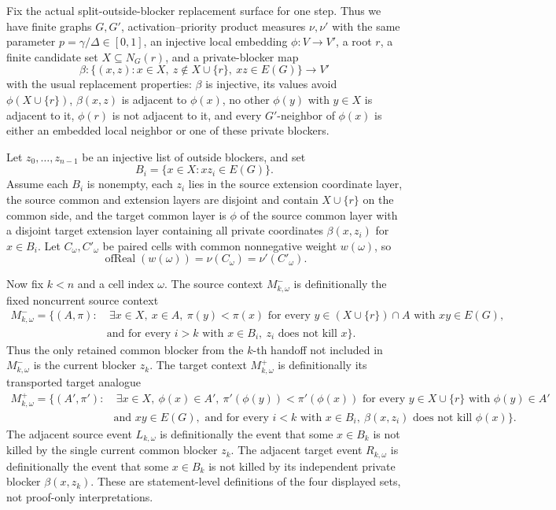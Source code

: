 \begin{helper}
Fix the actual split-outside-blocker replacement surface for one step.  Thus
we have finite graphs \(G,G'\), activation--priority product measures
\(\nu,\nu'\) with the same parameter \(p=\gamma/\Delta\in[0,1]\), an
injective local embedding \(\phi:V\to V'\), a root \(r\), a finite candidate
set \(X\subseteq N_G(r)\), and a private-blocker map
\[
\beta:\{(x,z):x\in X,\ z\notin X\cup\{r\},\ xz\in E(G)\}\to V'
\]
with the usual replacement properties: \(\beta\) is injective, its values
avoid \(\phi(X\cup\{r\})\), \(\beta(x,z)\) is adjacent to \(\phi(x)\), no
other \(\phi(y)\) with \(y\in X\) is adjacent to it, \(\phi(r)\) is not
adjacent to it, and every \(G'\)-neighbor of \(\phi(x)\) is either an
embedded local neighbor or one of these private blockers.

Let \(z_0,\ldots,z_{n-1}\) be an injective list of outside blockers, and set
\[
  B_i=\{x\in X:xz_i\in E(G)\}.
\]
Assume each \(B_i\) is nonempty, each \(z_i\) lies in the source extension
coordinate layer, the source common and extension layers are disjoint and
contain \(X\cup\{r\}\) on the common side, and the target common layer is
\(\phi\) of the source common layer with a disjoint target extension layer
containing all private coordinates \(\beta(x,z_i)\) for \(x\in B_i\).  Let
\(C_\omega,C'_\omega\) be paired cells with common nonnegative weight
\(w(\omega)\), so
\[
  \operatorname{ofReal}(w(\omega))=\nu(C_\omega)
  =\nu'(C'_\omega).
\]

Now fix \(k<n\) and a cell index \(\omega\).  The source context
\(M^-_{k,\omega}\) is definitionally the fixed noncurrent source context
\[
\begin{aligned}
M^-_{k,\omega}=\{(A,\pi):&\ \exists x\in X,\ x\in A,\ 
   \pi(y)<\pi(x)\text{ for every }y\in (X\cup\{r\})\cap A
   \text{ with }xy\in E(G),\\
&\text{and for every }i>k\text{ with }x\in B_i,\ 
   z_i\text{ does not kill }x\}.
\end{aligned}
\]
Thus the only retained common blocker from the \(k\)-th handoff not included
in \(M^-_{k,\omega}\) is the current blocker \(z_k\).  The target context
\(M^+_{k,\omega}\) is definitionally its transported target analogue
\[
\begin{aligned}
M^+_{k,\omega}=\{(A',\pi'):&\ \exists x\in X,\ \phi(x)\in A',\
   \pi'(\phi(y))<\pi'(\phi(x))\text{ for every }y\in X\cup\{r\}
   \text{ with }\phi(y)\in A'\\
&\text{and }xy\in E(G),\text{ and for every }i<k\text{ with }x\in B_i,\ 
   \beta(x,z_i)\text{ does not kill }\phi(x)\}.
\end{aligned}
\]
The adjacent source event \(L_{k,\omega}\) is definitionally the event that
some \(x\in B_k\) is not killed by the single current common blocker \(z_k\).
The adjacent target event \(R_{k,\omega}\) is definitionally the event that
some \(x\in B_k\) is not killed by its independent private blocker
\(\beta(x,z_k)\).  These are statement-level definitions of the four displayed
sets, not proof-only interpretations.


\end{helper}

